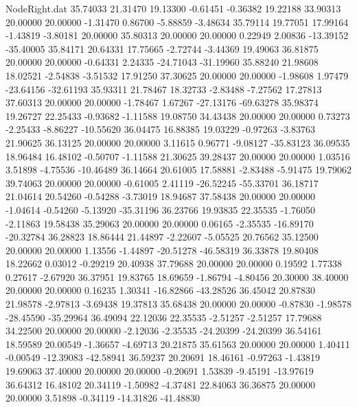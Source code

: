 \begin{filecontents}{NodeRight.dat}
  35.74033   21.31470   19.13300    -0.61451   -0.36382   19.22188   33.90313   20.00000   20.00000   -1.31470    0.86700   -5.88859   -3.48634
  35.79114   19.77051   17.99164    -1.43819   -3.80181   20.00000   35.80313   20.00000   20.00000    0.22949    2.00836  -13.39152  -35.40005
  35.84171   20.64331   17.75665    -2.72744   -3.44369   19.49063   36.81875   20.00000   20.00000   -0.64331    2.24335  -24.71043  -31.19960
  35.88240   21.98608   18.02521    -2.54838   -3.51532   17.91250   37.30625   20.00000   20.00000   -1.98608    1.97479  -23.64156  -32.61193
  35.93311   21.78467   18.32733    -2.83488   -7.27562   17.27813   37.60313   20.00000   20.00000   -1.78467    1.67267  -27.13176  -69.63278
  35.98374   19.26727   22.25433    -0.93682   -1.11588   19.08750   34.43438   20.00000   20.00000    0.73273   -2.25433   -8.86227  -10.55620
  36.04475   16.88385   19.03229    -0.97263   -3.83763   21.90625   36.13125   20.00000   20.00000    3.11615    0.96771   -9.08127  -35.83123
  36.09535   18.96484   16.48102    -0.50707   -1.11588   21.30625   39.28437   20.00000   20.00000    1.03516    3.51898   -4.75536  -10.46489
  36.14664   20.61005   17.58881    -2.83488   -5.91475   19.79062   39.74063   20.00000   20.00000   -0.61005    2.41119  -26.52245  -55.33701
  36.18717   21.04614   20.54260    -0.54288   -3.73019   18.94687   37.58438   20.00000   20.00000   -1.04614   -0.54260   -5.13920  -35.31196
  36.23766   19.93835   22.35535    -1.76050   -2.11863   19.58438   35.29063   20.00000   20.00000    0.06165   -2.35535  -16.89170  -20.32784
  36.28823   18.86444   21.44897    -2.22607   -5.05525   20.76562   35.12500   20.00000   20.00000    1.13556   -1.44897  -20.51278  -46.58319
  36.33878   19.80408   18.22662     0.03012   -0.29219   20.40938   37.79688   20.00000   20.00000    0.19592    1.77338    0.27617   -2.67920
  36.37951   19.83765   18.69659    -1.86794   -4.80456   20.30000   38.40000   20.00000   20.00000    0.16235    1.30341  -16.82866  -43.28526
  36.45042   20.87830   21.98578    -2.97813   -3.69438   19.37813   35.68438   20.00000   20.00000   -0.87830   -1.98578  -28.45590  -35.29964
  36.49094   22.12036   22.35535    -2.51257   -2.51257   17.79688   34.22500   20.00000   20.00000   -2.12036   -2.35535  -24.20399  -24.20399
  36.54161   18.59589   20.00549    -1.36657   -4.69713   20.21875   35.61563   20.00000   20.00000    1.40411   -0.00549  -12.39083  -42.58941
  36.59237   20.20691   18.46161    -0.97263   -1.43819   19.69063   37.40000   20.00000   20.00000   -0.20691    1.53839   -9.45191  -13.97619
  36.64312   16.48102   20.34119    -1.50982   -4.37481   22.84063   36.36875   20.00000   20.00000    3.51898   -0.34119  -14.31826  -41.48830

\end{filecontents}
